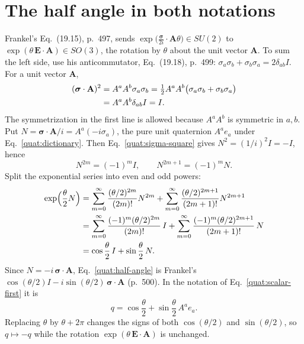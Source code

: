 \section{The half angle in both notations}
Frankel's Eq.~(19.15), p.~497, sends
$\exp\bigl(\tfrac{\boldsymbol\sigma}{2i}\cdot\mathbf A\theta\bigr)\in SU(2)$
to $\exp(\theta\,\mathbf E\cdot\mathbf A)\in SO(3)$, the rotation by
$\theta$ about the unit vector $\mathbf A$. To sum the left side, use his
anticommutator, Eq.~(19.18), p.~499:
$\sigma_a\sigma_b+\sigma_b\sigma_a=2\delta_{ab}I$. For a unit vector
$\mathbf A$,
\begin{align}
 (\boldsymbol\sigma\cdot\mathbf A)^2
 &=A^aA^b\sigma_a\sigma_b
  =\tfrac12A^aA^b\bigl(\sigma_a\sigma_b+\sigma_b\sigma_a\bigr)\notag\\
 &=A^aA^b\delta_{ab}I=I .\label{quat:sigma-square}
\end{align}
The symmetrization in the first line is allowed because $A^aA^b$ is
symmetric in $a,b$. Put $N=\boldsymbol\sigma\cdot\mathbf A/i
=A^a(-i\sigma_a)$, the pure unit quaternion $A^ae_a$ under
Eq.~\eqref{quat:dictionary}. Then Eq.~\eqref{quat:sigma-square} gives
$N^2=(1/i)^2I=-I$, hence
\begin{equation}
 N^{2m}=(-1)^mI,\qquad N^{2m+1}=(-1)^mN .
\end{equation}
Split the exponential series into even and odd powers:
\begin{align}
 \exp\Bigl(\frac{\theta}{2}N\Bigr)
 &=\sum_{m=0}^{\infty}\frac{(\theta/2)^{2m}}{(2m)!}N^{2m}
  +\sum_{m=0}^{\infty}\frac{(\theta/2)^{2m+1}}{(2m+1)!}N^{2m+1}\notag\\
 &=\sum_{m=0}^{\infty}\frac{(-1)^m(\theta/2)^{2m}}{(2m)!}\,I
  +\sum_{m=0}^{\infty}\frac{(-1)^m(\theta/2)^{2m+1}}{(2m+1)!}\,N\notag\\
 &=\cos\frac{\theta}{2}\,I+\sin\frac{\theta}{2}\,N .\label{quat:half-angle}
\end{align}
Since $N=-i\,\boldsymbol\sigma\cdot\mathbf A$, Eq.~\eqref{quat:half-angle}
is Frankel's $\cos(\theta/2)I-i\sin(\theta/2)\,\boldsymbol\sigma\cdot\mathbf A$
(p.~500). In the notation of Eq.~\eqref{quat:scalar-first} it is
\begin{equation}\label{quat:axis-angle}
 q=\cos\frac{\theta}{2}+\sin\frac{\theta}{2}\,A^ae_a .
\end{equation}
Replacing $\theta$ by $\theta+2\pi$ changes the signs of both
$\cos(\theta/2)$ and $\sin(\theta/2)$, so $q\mapsto-q$ while the rotation
$\exp(\theta\,\mathbf E\cdot\mathbf A)$ is unchanged.

